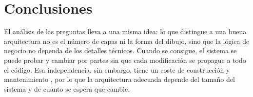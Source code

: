 
\chapter*{Conclusiones}

El análisis de las preguntas lleva a una misma idea: lo que distingue a una buena arquitectura no es el número de capas ni la forma del dibujo, sino que la lógica de negocio no dependa de los detalles técnicos. Cuando se consigue, el sistema se puede probar y cambiar por partes sin que cada modificación se propague a todo el código. Esa independencia, sin embargo, tiene un coste de construcción y mantenimiento , por lo que la arquitectura adecuada depende del tamaño del sistema y de cuánto se espera que cambie.
